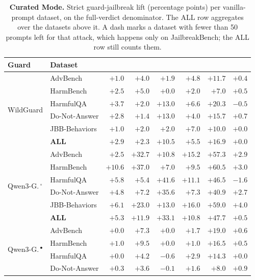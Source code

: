 \begin{table}[htbp]
\caption{\NEWr \textbf{Curated Mode.} Strict guard-jailbreak lift (percentage points) per vanilla-prompt dataset, on the full-verdict denominator. The ALL row aggregates over the datasets above it. A dash marks a dataset with fewer than 50 prompts left for that attack, which happens only on JailbreakBench; the ALL row still counts them.}
\label{tab:gj-lift-curated}
\centering\scriptsize
\setlength{\tabcolsep}{3pt}
\begin{tabular}{l l r r r r r r}
\toprule
Guard & Dataset & \attFITD{} & \attLogi{} & \attBit{} & \attResp{} & \attReNe{} & \attHum{} \\
\midrule
\multirow{6}{*}{WildGuard}
 & AdvBench & $+1.0$ & $+4.0$ & $+1.9$ & $+4.8$ & $+11.7$ & $+0.4$ \\
 & HarmBench & $+2.5$ & $+5.0$ & $+0.0$ & $+2.0$ & $+7.0$ & $+0.5$ \\
 & HarmfulQA & $+3.7$ & $+2.0$ & $+13.0$ & $+6.6$ & $+20.3$ & $-0.5$ \\
 & Do-Not-Answer & $+2.8$ & $+1.4$ & $+13.0$ & $+4.0$ & $+15.7$ & $+0.7$ \\
 & JBB-Behaviors & $+1.0$ & $+2.0$ & $+2.0$ & $+7.0$ & $+10.0$ & $+0.0$ \\
 & \textbf{ALL} & $+2.9$ & $+2.3$ & $+10.5$ & $+5.5$ & $+16.9$ & $+0.0$ \\
\midrule
\multirow{6}{*}{Qwen3-G.\,$^{\circ}$}
 & AdvBench & $+2.5$ & $+32.7$ & $+10.8$ & $+15.2$ & $+57.3$ & $+2.9$ \\
 & HarmBench & $+10.6$ & $+37.0$ & $+7.0$ & $+9.5$ & $+60.5$ & $+3.0$ \\
 & HarmfulQA & $+5.8$ & $+5.4$ & $+41.6$ & $+11.1$ & $+46.5$ & $-1.6$ \\
 & Do-Not-Answer & $+4.8$ & $+7.2$ & $+35.6$ & $+7.3$ & $+40.9$ & $+2.7$ \\
 & JBB-Behaviors & $+6.1$ & $+23.0$ & $+13.0$ & $+16.0$ & $+59.0$ & $+4.0$ \\
 & \textbf{ALL} & $+5.3$ & $+11.9$ & $+33.1$ & $+10.8$ & $+47.7$ & $+0.5$ \\
\midrule
\multirow{6}{*}{Qwen3-G.\,$^{\bullet}$}
 & AdvBench & $+0.0$ & $+7.3$ & $+0.0$ & $+1.7$ & $+19.0$ & $+0.6$ \\
 & HarmBench & $+1.0$ & $+9.5$ & $+0.0$ & $+1.0$ & $+16.5$ & $+0.5$ \\
 & HarmfulQA & $+0.0$ & $+4.2$ & $-0.6$ & $+2.9$ & $+14.3$ & $+0.0$ \\
 & Do-Not-Answer & $+0.3$ & $+3.6$ & $-0.1$ & $+1.6$ & $+8.0$ & $+0.9$ \\

\end{tabular}
\end{table}
